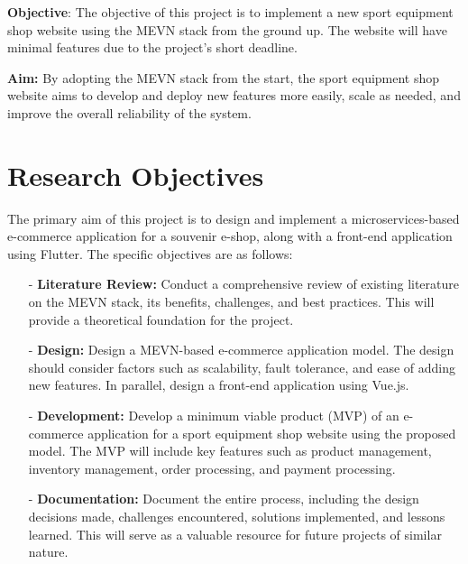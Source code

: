 \textbf{Objective}: The objective of this project is to implement a new sport equipment shop website using the MEVN stack from the ground up. The website will have minimal features due to the project's short deadline.

\textbf{Aim:} By adopting the MEVN stack from the start, the sport equipment shop website aims to develop and deploy new features more easily, scale as needed, and improve the overall reliability of the system.

\section{Research Objectives}
The primary aim of this project is to design and implement a microservices-based e-commerce application for a souvenir e-shop, along with a front-end application using Flutter. The specific objectives are as follows:
\begin{itemize}
    \item[-] \textbf{Literature Review:} Conduct a comprehensive review of existing literature on the MEVN stack, its benefits, challenges, and best practices. This will provide a theoretical foundation for the project.
    \item[-] \textbf{Design:} Design a MEVN-based e-commerce application model. The design should consider factors such as scalability, fault tolerance, and ease of adding new features. In parallel, design a front-end application using Vue.js.
    \item[-] \textbf{Development:} Develop a minimum viable product (MVP) of an e-commerce application for a sport equipment shop website using the proposed model. The MVP will include key features such as product management, inventory management, order processing, and payment processing.
    \item[-] \textbf{Documentation:} Document the entire process, including the design decisions made, challenges encountered, solutions implemented, and lessons learned. This will serve as a valuable resource for future projects of similar nature.
\end{itemize}
